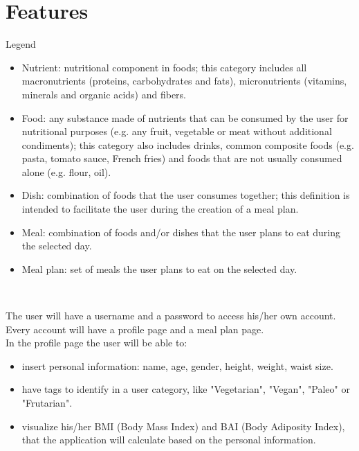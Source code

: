 \documentclass{article}
\begin{document}
\section{Features}
\begin{small}
	\textasteriskcentered\textasteriskcentered\textasteriskcentered \space Legend \space \textasteriskcentered\textasteriskcentered\textasteriskcentered\\
	\begin{itemize}
		\renewcommand\labelitemi{{\boldmath$\cdot$}}
		\item Nutrient: nutritional component in foods; this category includes all macronutrients (proteins, carbohydrates and fats), micronutrients (vitamins, minerals and organic acids) and fibers.
		\item Food: any substance made of nutrients that can be consumed by the user for nutritional purposes (e.g. any fruit, vegetable or meat without additional condiments); this category also includes drinks, common composite foods (e.g. pasta, tomato sauce, French fries) and foods that are not usually consumed alone (e.g. flour, oil).
		\item Dish: combination of foods that the user consumes together; this definition is intended to facilitate the user during the creation of a meal plan.
		\item Meal: combination of foods and/or dishes that the user plans to eat during the selected day.
		\item Meal plan: set of meals the user plans to eat on the selected day.\\
	\end{itemize}
	\hspace*{0.5cm}\textasteriskcentered\textasteriskcentered\textasteriskcentered\textasteriskcentered\textasteriskcentered\textasteriskcentered\textasteriskcentered\textasteriskcentered\textasteriskcentered\textasteriskcentered\textasteriskcentered\textasteriskcentered\textasteriskcentered\textasteriskcentered\textasteriskcentered\\
\end{small}


The user will have a username and a password to access his/her own account. Every account will have a profile page and a meal plan page.\\
In the profile page the user will be able to:

\begin{itemize}

  \item insert personal information: name, age, gender, height, weight, waist size.
  \item have tags to identify in a user category, like "Vegetarian", "Vegan", "Paleo" or "Frutarian".
  \item visualize his/her BMI (Body Mass Index) and BAI (Body Adiposity Index), that the application will calculate based on the personal information.

\end{itemize}
\end{document}
